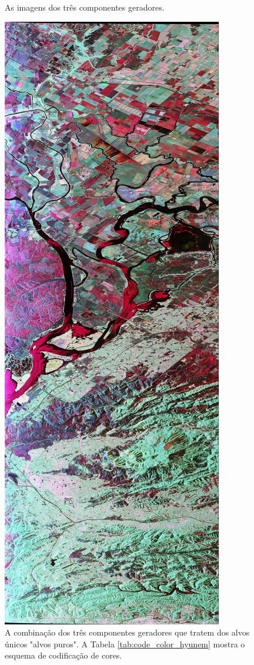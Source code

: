 \documentclass{article}
\begin{document}
\begin{figure}[H]
    \caption{As imagens dos três componentes geradores.}
\end{figure}

\begin{figure}[H]
    \centering
    \includegraphics[width=.4\linewidth]{Images/Hyunen.png}
    \caption{A combinação dos três componentes geradores que tratem dos alvos únicos "alvos puros". A Tabela \ref{tab:code_color_hyunem} mostra o esquema de codificação de cores.}
    \label{fig:Hyunem}
\end{figure}
\end{document}
